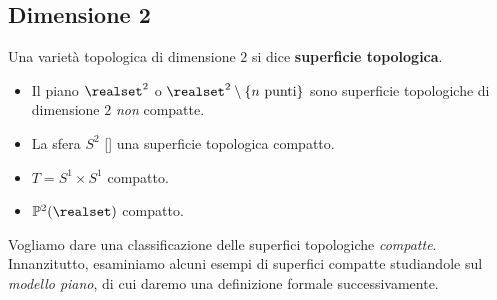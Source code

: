 	\subsection{Dimensione 2}
\begin{define} 
	Una varietà topologica di dimensione $2$ si dice \textbf{superficie topologica}.
\end{define}
\begin{examples}
	\begin{itemize}
		\item Il piano $\realset^2$ o $\realset^2\setminus \{n\text{ punti}\}$ sono superficie topologiche di dimensione $2$ \textit{non} compatte.
		\item La sfera $S^2$ [] una superficie topologica compatto.
		\item $T=S^1\times S^1$ compatto.
		\item $\mathbb{P}^2(\realset)$ compatto.
	\end{itemize}
\end{examples}
Vogliamo dare una classificazione delle superfici topologiche \textit{compatte}. Innanzitutto, esaminiamo alcuni esempi di superfici compatte studiandole sul \textit{modello piano}, di cui daremo una definizione formale successivamente.
